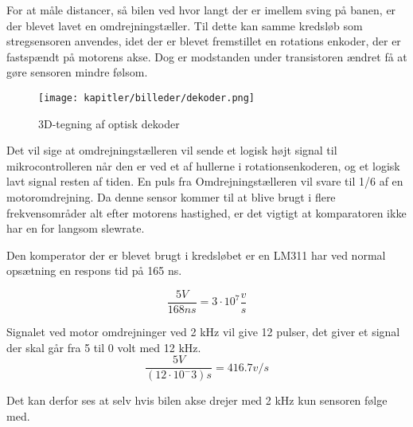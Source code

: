 For at måle distancer, så bilen ved hvor langt der er imellem sving på banen, er der blevet lavet en omdrejningstæller. Til dette kan samme kredsløb som stregsensoren anvendes, idet der er blevet fremstillet en rotations enkoder, der er fastspændt på motorens akse. Dog er modstanden under transistoren ændret få at gøre sensoren mindre følsom.


\begin{figure}[ht]
    \centering
    \texttt{[image: kapitler/billeder/dekoder.png]}
    \caption{3D-tegning af optisk dekoder}
    \label{fig:dekoder}
\end{figure}


Det vil sige at omdrejningstælleren vil sende et logisk højt signal til mikrocontrolleren når den er ved et af hullerne i  rotationsenkoderen, og et logisk lavt signal resten af tiden. En puls fra Omdrejningstælleren vil svare til 1/6 af en motoromdrejning.
Da denne sensor kommer til at blive brugt i flere frekvensområder alt efter motorens hastighed, er det vigtigt at komparatoren ikke har en for langsom slewrate.

Den komperator der er blevet brugt i kredsløbet er en LM311 har ved normal opsætning en respons tid på 165 ns. \cite{LM311}

\begin{equation}
\frac{5 V}{168 ns} = 3 \cdot 10^7 \frac{v}{s}
\end{equation}

Signalet ved motor omdrejninger ved 2 kHz vil give 12 pulser, det giver et signal der skal går fra 5 til 0 volt med 12 kHz.
\begin{equation}
\frac{5 V}{(12 \cdot 10^-3)s} = 416.7 v/s
\end{equation}

Det kan derfor ses at selv hvis bilen akse drejer med 2 kHz kun sensoren følge med.
